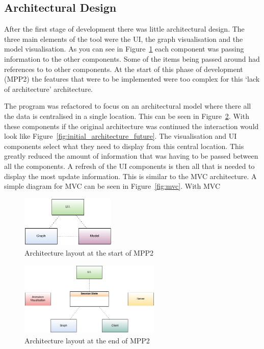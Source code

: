 \subsection{Architectural Design}
\label{sec:architecture}
After the first stage of development there was little architectural design.  The three main elements of the tool were the \ac{UI}, the graph visualisation and the model visualisation.   As you can see in Figure~\ref{fig:initial_architecture} each component was passing information to the other components.  Some of the items being passed around had references to to other components.  At the start of this phase of development (MPP2) the features that were to be implemented were too complex for this `lack of architecture' architecture.

The program was refactored to focus on an architectural model where there all the data is centralised in a single location.  This can be seen in Figure~\ref{fig:final_architecture}.  With these components if the original architecture was continued the interaction would look like Figure~\ref{fig:initial_architecture_future}.  The visualisation and \ac{UI} components select what they need to display from this central location.  This greatly reduced the amount of information that was having to be passed between all the components.  A refresh of the \ac{UI} components is then all that is needed to display the most update information.  This is similar to the \ac{MVC} architecture.  A simple diagram for \ac{MVC} can be seen in Figure~\ref{fig:mvc}.  With \ac{MVC}

\begin{figure}[h!]
    \centering
    \includegraphics[width=0.4\textwidth]{images/initial_architecture.png}
    \caption{Architecture layout at the start of MPP2}
    \label{fig:initial_architecture}
\end{figure}

\begin{figure}[h!]
    \centering
    \includegraphics[width=0.6\textwidth]{images/final_architecture.png}
    \caption{Architecture layout at the end of MPP2}
    \label{fig:final_architecture}
\end{figure}

